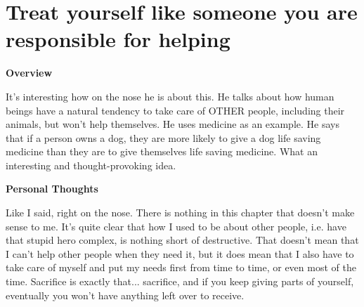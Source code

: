 \documentclass{article}
\begin{document}
\section{Treat yourself like someone you are responsible for helping}
       \begin{multicols}{2}
        \begin{center}
            \textbf{Overview}
        \end{center}
        
        It's interesting how on the nose he is about this. He talks about how human beings have a natural tendency to take care of OTHER people, including their animals, but won't help themselves. He uses medicine as an example. He says that if a person owns a dog, they are more likely to give a dog life saving medicine than they are to give themselves life saving medicine. What an interesting and thought-provoking idea. 

        \begin{center}
            \textbf{Personal Thoughts}
        \end{center}
        
        Like I said, right on the nose. There is nothing in this chapter that doesn't make sense to me. It's quite clear that how I used to be about other people, i.e. have that stupid hero complex, is nothing short of destructive. That doesn't mean that I can't help other people when they need it, but it does mean that I also have to take care of myself and put my needs first from time to time, or even most of the time. Sacrifice is exactly that... sacrifice, and if you keep giving parts of yourself, eventually you won't have anything left over to receive.
        
    \end{multicols}
    
\end{document}
